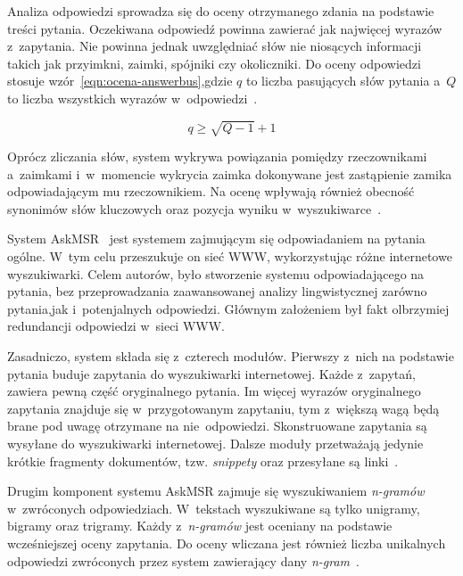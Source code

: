 Analiza odpowiedzi sprowadza się do oceny otrzymanego zdania na podstawie treści pytania. Oczekiwana odpowiedź powinna zawierać jak najwięcej wyrazów z~zapytania. Nie powinna jednak uwzględniać słów nie niosących informacji takich jak przyimkni, zaimki, spójniki czy okoliczniki. Do oceny odpowiedzi stosuje wzór~\ref{eqn:ocena-answerbus},gdzie $q$ to liczba pasujących słów pytania a~$Q$ to liczba wszystkich wyrazów w~odpowiedzi~\cite{zheng2002answerbus}.

\begin{equation}
\label{eqn:ocena-answerbus}
q \geq  \sqrt{Q - 1}  + 1
\end{equation}

Oprócz zliczania słów, system wykrywa powiązania pomiędzy rzeczownikami a~zaimkami i~w~momencie wykrycia zaimka dokonywane jest zastąpienie zamika odpowiadającym mu rzeczownikiem. Na ocenę wpływają również obecność synonimów słów kluczowych oraz pozycja wyniku w~wyszukiwarce~\cite{zheng2002answerbus}.

\label{askmr}
System AskMSR~\cite{brill2002analysis} jest systemem zajmującym się odpowiadaniem na pytania ogólne. W~tym celu przeszukuje on sieć WWW, wykorzystując różne internetowe wyszukiwarki. Celem autorów, było stworzenie systemu odpowiadającego na pytania, bez przeprowadzania zaawansowanej analizy lingwistycznej zarówno pytania,jak i~potenjalnych odpowiedzi. Głównym założeniem był fakt olbrzymiej redundancji odpowiedzi w~sieci WWW.

Zasadniczo, system składa się z~czterech modułów. Pierwszy z~nich na podstawie pytania buduje zapytania do wyszukiwarki internetowej. Każde z~zapytań, zawiera pewną część oryginalnego pytania. Im więcej wyrazów oryginalnego zapytania znajduje się w~przygotowanym zapytaniu, tym z~większą wagą będą brane pod uwagę otrzymane na nie odpowiedzi. Skonstruowane zapytania są wysyłane do wyszukiwarki internetowej. Dalsze moduły przetważają jedynie krótkie fragmenty dokumentów, tzw. \emph{snippety} oraz przesyłane są linki~\cite{brill2002analysis}.

Drugim komponent systemu AskMSR zajmuje się wyszukiwaniem \emph{n-gramów} w~zwróconych odpowiedziach. W~tekstach wyszukiwane są tylko unigramy, bigramy oraz trigramy. Każdy z~\emph{n-gramów} jest oceniany na podstawie wcześniejszej oceny zapytania. Do oceny wliczana jest również liczba unikalnych odpowiedzi zwróconych przez system zawierający dany \emph{n-gram}~\cite{brill2002analysis}.

